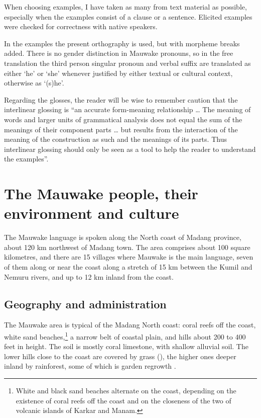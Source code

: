 When choosing examples, I have taken as many from text material as possible, especially when the examples consist of a clause or a sentence.  Elicited examples were checked for correctness with native speakers.

In the examples the present orthography is used, but with morpheme breaks added. There is no gender distinction in Mauwake pronouns, so in the free translation the third person singular pronoun and verbal suffix are translated as either `he' or `she' whenever justified by either textual or cultural context, otherwise as `(s)he'. 

Regarding the glosses, the reader will be wise to remember  caution that the interlinear glossing is  ``an accurate form-meaning relationship {\dots} The meaning of words and larger units of grammatical analysis does not equal the sum of the meanings of their component parts {\dots} but results from the interaction of the meaning of the construction as such and the meanings of its parts.  Thus interlinear glossing should only be seen as a tool to help the reader to understand the examples''. 

\section{The Mauwake people, their environment and culture}
The Mauwake language is spoken along the North coast of Madang province, about 120 km northwest of Madang town. The area comprises about 100 square kilometres, and there are 15 villages where Mauwake is the main language, seven of them along or near the coast along a stretch of 15 km between the Kumil and Nemuru rivers, and up to 12 km inland from the coast.

\subsection{Geography and administration} 
The Mauwake area is typical of the Madang North coast: coral reefs off the coast, white sand beaches,\footnote{White and black sand beaches alternate on the coast, depending on the existence of coral reefs off the coast and on the closeness of the two of volcanic islands of Karkar and Manam.} a narrow belt of coastal plain, and hills about 200 to 400 feet in height. The soil is mostly coral limestone, with shallow alluvial soil.  The lower hills close to the coast are covered by  grass (), the higher ones deeper inland by rainforest, some of which is garden regrowth \citep[22]{HaantjensEtAl1976}. 

